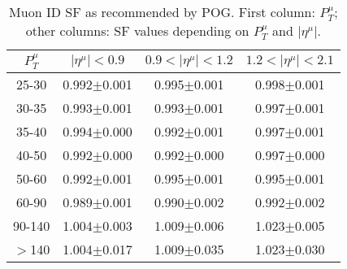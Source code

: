 \begin{table}[h]
  \footnotesize
  \begin{center}
  \caption{Muon ID SF as recommended by POG. First column: $P_T^{\mu}$; other columns: SF values depending on $P_T^{\mu}$ and $|\eta^{\mu}|$.} 
   \begin{tabular}{|c|c|c|c|}
 $P_T^{\mu}$  & $|\eta^{\mu}|< 0.9$   & $0.9<|\eta^{\mu}|< 1.2$    & $1.2<|\eta^{\mu}|< 2.1$ \\ \hline
25-30          & 0.992$\pm$0.001   & 0.995$\pm$0.001    & 0.998$\pm$0.001     \\ \hline
30-35          & 0.993$\pm$0.001   & 0.993$\pm$0.001    & 0.997$\pm$0.001        \\ \hline
35-40          & 0.994$\pm$0.000   & 0.992$\pm$0.001    & 0.997$\pm$0.001        \\ \hline
40-50          & 0.992$\pm$0.000   & 0.992$\pm$0.000    & 0.997$\pm$0.000        \\ \hline
50-60          & 0.992$\pm$0.001   & 0.995$\pm$0.001    & 0.995$\pm$0.001        \\ \hline
60-90          & 0.989$\pm$0.001   & 0.990$\pm$0.002    & 0.992$\pm$0.002        \\ \hline
90-140         & 1.004$\pm$0.003   & 1.009$\pm$0.006    & 1.023$\pm$0.005        \\ \hline
$>$140         & 1.004$\pm$0.017   & 1.009$\pm$0.035    & 1.023$\pm$0.030        \\ \hline
  \end{tabular}
  \label{tab:SFs_MuonID}
  \end{center}
\end{table}


